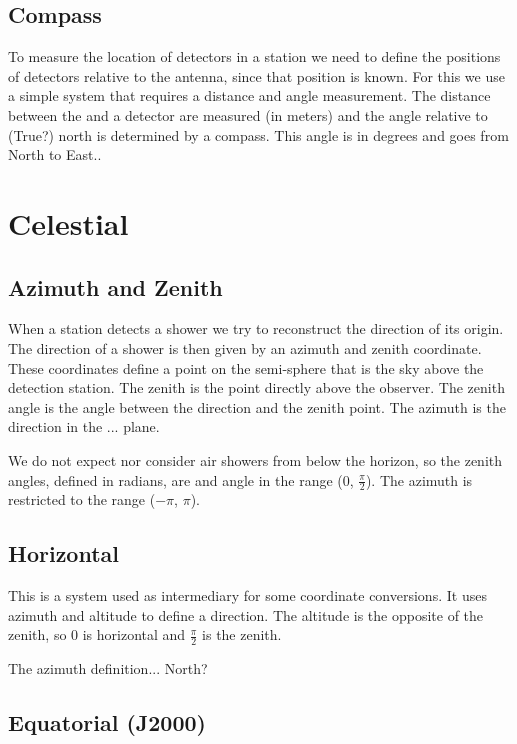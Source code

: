 \subsection{Compass}

To measure the location of detectors in a station we need to define the
positions of detectors relative to the \gps antenna, since that position
is known. For this we use a simple system that requires a distance and
angle measurement. The distance between the \gps and a detector are
measured (in meters) and the angle relative to (True?) north is
determined by a compass. This angle is in degrees and goes from North to
East..


\section{Celestial}

\subsection{Azimuth and Zenith}

When a station detects a shower we try to reconstruct the direction of
its origin. The direction of a shower is then given by an azimuth and
zenith coordinate. These coordinates define a point on the semi-sphere
that is the sky above the detection station. The zenith is the point
directly above the observer. The zenith angle is the angle between the
direction and the zenith point. The azimuth is the direction in the ...
plane.

We do not expect nor consider air showers from below the horizon, so the
zenith angles, defined in radians, are and angle in the range (0,
$\frac{\pi}{2}$). The azimuth is restricted to the range ($-\pi$, $\pi$).


\subsection{Horizontal}

This is a system used as intermediary for some coordinate conversions.
It uses azimuth and altitude to define a direction. The altitude is the
opposite of the zenith, so 0 is horizontal and $\frac{\pi}{2}$ is the
zenith.

The azimuth definition... North?


\subsection{Equatorial (J2000)}

